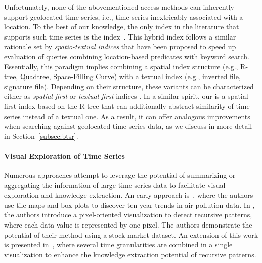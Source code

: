 Unfortunately, none of the abovementioned access methods can inherently support geolocated time series, i.e., time series inextricably associated with a location. To the best of our knowledge, the only index in the literature that supports such time series is the \btsr index~\cite{chatzig17btsr}. This hybrid index follows a similar rationale set by {\em spatio-textual indices} \cite{chen2013pvldb} that have been proposed to speed up evaluation of queries combining location-based predicates with keyword search. Essentially, this paradigm implies combining a spatial index structure (e.g., R-tree, Quadtree, Space-Filling Curve) with a textual index (e.g., inverted file, signature file). Depending on their structure, these variants can be characterized either as {\em spatial-first} or {\em textual-first} indices \cite{christoforaki2011cikm}. In a similar spirit, our \btsr is a spatial-first index based on the R-tree that can additionally abstract similarity of time series instead of a textual one. As a result, it can offer analogous improvements when searching against geolocated time series data, as we discuss in more detail in Section~\ref{subsec:btsr}.

\paragraph{Visual Exploration of Time Series} Numerous approaches attempt to leverage the potential of summarizing or aggregating the information of large time series data to facilitate visual exploration and knowledge extraction. An early approach is~\cite{mintz1997tracking}, where the authors use tile maps and box plots to discover ten-year trends in air pollution data. In \cite{keim1995recursive}, the authors introduce a pixel-oriented visualization to detect recursive patterns, where each data value is represented by one pixel. The authors demonstrate the potential of their method using a stock market dataset. An extension of this work is presented in~\cite{lammarsch2009hierarchical}, where several time granularities are combined in a single visualization to enhance the knowledge extraction potential of recursive patterns. 

